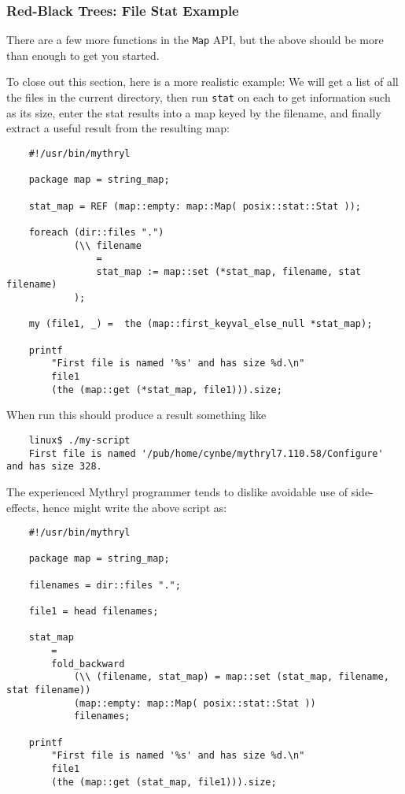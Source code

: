 \cutend*

\subsubsection{Red-Black Trees:  File Stat Example}

There are a few more functions in the {\tt Map} API, but the above 
should be more than enough to get you started.

To close out this section, here is a more realistic example:  We 
will get a list of all the files in the current directory, then 
run {\tt stat} on each to get information such as its size, enter 
the stat results into a map keyed by the filename, and finally 
extract a useful result from the resulting map:

\begin{verbatim}
    #!/usr/bin/mythryl

    package map = string_map;

    stat_map = REF (map::empty: map::Map( posix::stat::Stat ));

    foreach (dir::files ".")
            (\\ filename
                =
                stat_map := map::set (*stat_map, filename, stat filename)
            );

    my (file1, _) =  the (map::first_keyval_else_null *stat_map);

    printf
        "First file is named '%s' and has size %d.\n"
        file1
        (the (map::get (*stat_map, file1))).size;
\end{verbatim}

When run this should produce a result something like
\begin{verbatim}
    linux$ ./my-script
    First file is named '/pub/home/cynbe/mythryl7.110.58/Configure' and has size 328.
\end{verbatim}

The experienced Mythryl programmer tends to dislike avoidable use 
of side-effects, hence might write the above script as:

\begin{verbatim}
    #!/usr/bin/mythryl

    package map = string_map;

    filenames = dir::files ".";

    file1 = head filenames;

    stat_map
        =
        fold_backward
            (\\ (filename, stat_map) = map::set (stat_map, filename, stat filename))
            (map::empty: map::Map( posix::stat::Stat ))
            filenames;

    printf
        "First file is named '%s' and has size %d.\n"
        file1
        (the (map::get (stat_map, file1))).size;
\end{verbatim}

